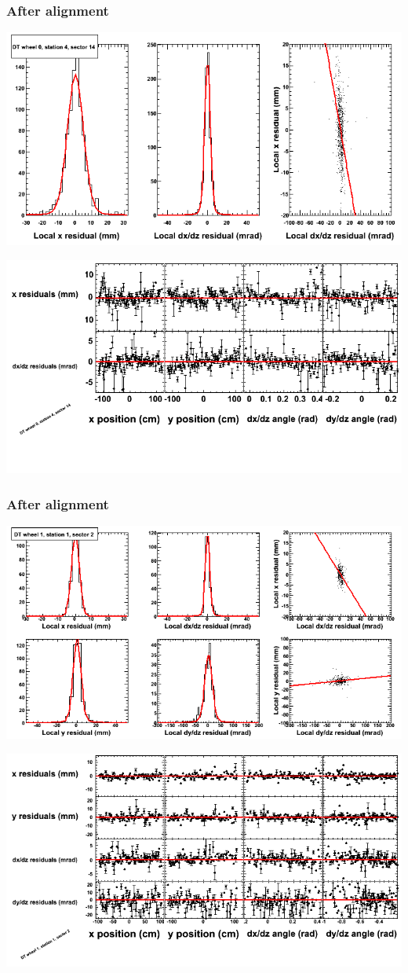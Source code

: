 \documentclass[compress]{beamer}
\begin{document}
\begin{frame}
\frametitle{After alignment}
\includegraphics[width=0.7\linewidth]{NOV4_fitfunctions/MBwhCst4sec14_bellcurves.png}

\includegraphics[width=0.7\linewidth]{NOV4_fitfunctions/MBwhCst4sec14_polynomials.png}
\end{frame}

\begin{frame}
\frametitle{After alignment}
\includegraphics[width=0.7\linewidth]{NOV4_fitfunctions/MBwhDst1sec02_bellcurves.png}

\includegraphics[width=0.7\linewidth]{NOV4_fitfunctions/MBwhDst1sec02_polynomials.png}
\end{frame}
\end{document}
